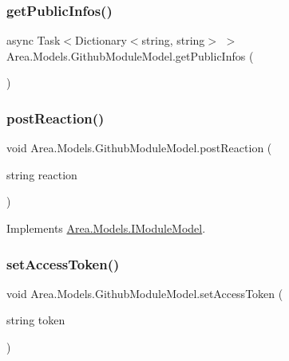 \subsubsection{\texorpdfstring{get\+Public\+Infos()}{getPublicInfos()}}
{\footnotesize\ttfamily async Task$<$Dictionary$<$string, string$>$ $>$ Area.\+Models.\+Github\+Module\+Model.\+get\+Public\+Infos (\begin{DoxyParamCaption}{ }\end{DoxyParamCaption})\hspace{0.3cm}{\ttfamily [inline]}}

\mbox{\label{classArea_1_1Models_1_1GithubModuleModel_aeeda0ad6ec3b9ddaa5a38e9b8a2ef020}} 
\subsubsection{\texorpdfstring{post\+Reaction()}{postReaction()}}
{\footnotesize\ttfamily void Area.\+Models.\+Github\+Module\+Model.\+post\+Reaction (\begin{DoxyParamCaption}\item[{string}]{reaction }\end{DoxyParamCaption})\hspace{0.3cm}{\ttfamily [inline]}}



Implements \mbox{\hyperlink{interfaceArea_1_1Models_1_1IModuleModel_af2c1a82bd894255ab2099440f4f3d6f7}{Area.\+Models.\+I\+Module\+Model}}.

\mbox{\label{classArea_1_1Models_1_1GithubModuleModel_a71c393a20452dff06a57b49b97a50e0d}} 
\subsubsection{\texorpdfstring{set\+Access\+Token()}{setAccessToken()}}
{\footnotesize\ttfamily void Area.\+Models.\+Github\+Module\+Model.\+set\+Access\+Token (\begin{DoxyParamCaption}\item[{string}]{token }\end{DoxyParamCaption})\hspace{0.3cm}{\ttfamily [inline]}}



